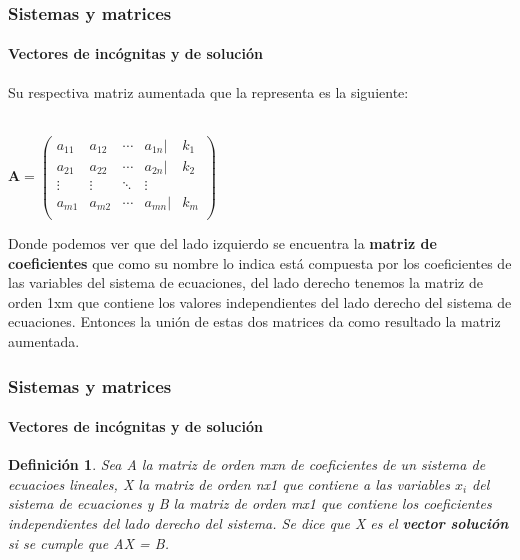 \documentclass[11pt]{beamer}
\newtheorem{defi}{Definición}
\begin{document}
\begin{frame}
\frametitle{Sistemas y matrices}
\framesubtitle{Vectores de incógnitas y de solución}
Su respectiva matriz aumentada que la representa es la siguiente: \\ \hspace{0cm} \\
\begin{center}
${\displaystyle \mathbf {A} ={\begin{pmatrix}a_{11}&a_{12}&\cdots &a_{1n}| &k_1\\a_{21}&a_{22}&\cdots &a_{2n}| &k_2\\\vdots &\vdots &\ddots &\vdots \\a_{m1}&a_{m2}&\cdots &a_{mn}| &k_m\\\end{pmatrix}}}$
\end{center}
Donde podemos ver que del lado izquierdo se encuentra la \textbf{matriz de coeficientes} que como su nombre lo indica está compuesta por los coeficientes de las variables del sistema de ecuaciones, del lado derecho tenemos la matriz de orden 1xm que contiene los valores independientes del lado derecho del sistema de ecuaciones. Entonces la unión de estas dos matrices da como resultado la matriz aumentada.
\end{frame}

\begin{frame}
\frametitle{Sistemas y matrices}
\framesubtitle{Vectores de incógnitas y de solución}
\begin{defi}
Sea A la matriz de orden mxn de coeficientes de un sistema de ecuacioes lineales, X la matriz de orden nx1 que contiene a las variables $x_i$ del sistema de ecuaciones y B la matriz de orden mx1 que contiene los coeficientes independientes del lado derecho del sistema. Se dice que X es el \textbf{vector solución} si se cumple que AX = B.
\end{defi}
\end{frame}
\end{document}
